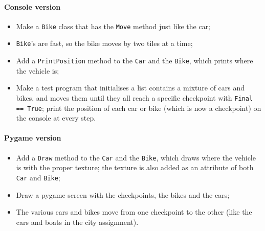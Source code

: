 \documentclass[12pt,a4paper,draft]{article}
\begin{document}
		\paragraph*{Console version}
		\begin{itemize}
			\item Make a \texttt{Bike} class that has the \texttt{Move} method just like the car;
			\item \texttt{Bike}'s are fast, so the bike moves by two tiles at a time;
			\item Add a \texttt{PrintPosition} method to the \texttt{Car} and the \texttt{Bike}, which prints where the vehicle is;
			\item Make a test program that initialises a list contains a mixture of cars and bikes, and moves them until they all reach a specific checkpoint with \texttt{Final == True}; print the position of each car or bike (which is now a checkpoint) on the console at every step.
		\end{itemize}
		
		\paragraph*{Pygame version}
		\begin{itemize}
			\item Add a \texttt{Draw} method to the \texttt{Car} and the \texttt{Bike}, which draws where the vehicle is with the proper texture; the texture is also added as an attribute of both \texttt{Car} and \texttt{Bike};
			\item Draw a pygame screen with the checkpoints, the bikes and the cars;
			\item The various cars and bikes move from one checkpoint to the other (like the cars and boats in the city assignment).
		\end{itemize}
	
\end{document}
